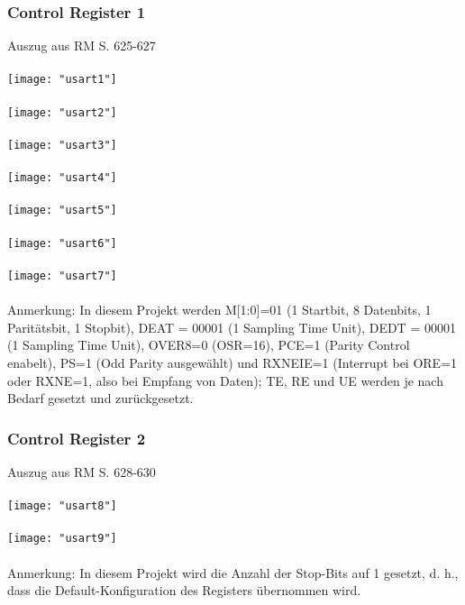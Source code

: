 \documentclass[11pt]{report}
\begin{document}
			\subsubsection{Control Register 1}
				Auszug aus RM S. 625-627\\
				\\\texttt{[image: "usart1"]}\\
				\\\texttt{[image: "usart2"]}\\
				\\\texttt{[image: "usart3"]}\\
				\\\texttt{[image: "usart4"]}\\
				\\\texttt{[image: "usart5"]}\\
				\\\texttt{[image: "usart6"]}\\
				\\\texttt{[image: "usart7"]}\\
				\\Anmerkung: In diesem Projekt werden M[1:0]=01 (1 Startbit, 8 Datenbits, 1 Paritätsbit, 1 Stopbit), DEAT = 00001 (1 Sampling Time Unit), DEDT = 00001 (1 Sampling Time Unit), OVER8=0 (OSR=16), PCE=1 (Parity Control enabelt), PS=1 (Odd Parity ausgewählt) und RXNEIE=1 (Interrupt bei ORE=1 oder RXNE=1, also bei Empfang von Daten); TE, RE und UE werden je nach Bedarf gesetzt und zurückgesetzt.
			\subsubsection{Control Register 2}
				Auszug aus RM S. 628-630\\
				\\\texttt{[image: "usart8"]}\\
				\\\texttt{[image: "usart9"]}\\
				\\Anmerkung: In diesem Projekt wird die Anzahl der Stop-Bits auf 1 gesetzt, d. h., dass die Default-Konfiguration des Registers übernommen wird.
\end{document}
